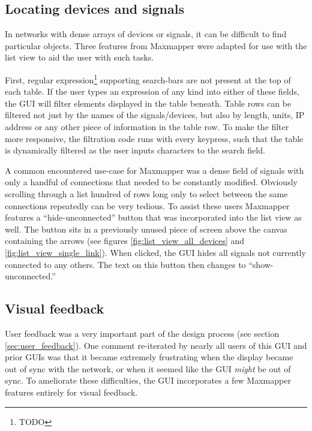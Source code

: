 
	\subsection{Locating devices and signals} %
	\label{sub:locating_devices_and_signals}

In networks with dense arrays of devices or signals, it can be difficult to find particular objects. Three features from Maxmapper were adapted for use with the list view to aid the user with such tasks.

First, regular expression\footnote{TODO} supporting search-bars are not present at the top of each table. If the user types an expression of any kind into either of these fields, the GUI will filter elements displayed in the table beneath. Table rows can be filtered not just by the names of the signals/devices, but also by length, units, IP address or any other piece of information in the table row. To make the filter more responsive, the filtration code runs with every keypress, such that the table is dynamically filtered as the user inputs characters to the search field. 

A common encountered use-case for Maxmapper was a dense field of signals with only a handful of connections that needed to be constantly modified. Obviously scrolling through a list hundred of rows long only to select between the same connections repeatedly can be very tedious. To assist these users Maxmapper features a ``hide-unconnected'' button that was incorporated into the list view as well. The button sits in a previously unused piece of screen above the canvas containing the arrows (see figures \ref{fig:list_view_all_devices} and \ref{fig:list_view_single_link}). When clicked, the GUI hides all signals not currently connected to any others. The text on this button then changes to ``show-unconnected.''

	\subsection{Visual feedback} %
	\label{sub:visual_feedback}

User feedback was a very important part of the design process (see section \ref{sec:user_feedback}). One comment re-iterated by nearly all users of this GUI and prior GUIs was that it became extremely frustrating when the display became out of sync with the network, or when it seemed like the GUI \emph{might} be out of sync. To ameliorate these difficulties, the GUI incorporates a few Maxmapper features entirely for visual feedback.


